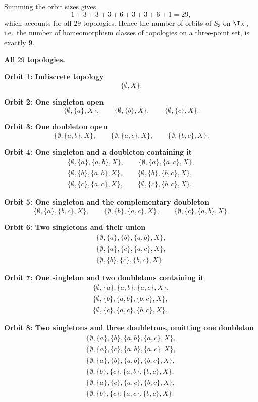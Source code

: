 Summing the orbit sizes gives
\[ 1+3+3+3+6+3+3+6+1=29, \]
which accounts for all $29$ topologies. Hence the number of orbits of $S_3$ on $\T_X$, i.e.\ the
number of homeomorphism classes of topologies on a three-point set, is exactly \textbf{9}.


\medskip\noindent\textbf{All $29$ topologies.}\par\medskip

\textbf{Orbit 1: Indiscrete topology}
\[ \{\emptyset,X\}. \]

\textbf{Orbit 2: One singleton open}
\[ \{\emptyset,\{a\},X\},\qquad\{\emptyset,\{b\},X\},\qquad\{\emptyset,\{c\},X\}. \]

\textbf{Orbit 3: One doubleton open}
\[ \{\emptyset,\{a,b\},X\},\qquad\{\emptyset,\{a,c\},X\},\qquad\{\emptyset,\{b,c\},X\}. \]

\textbf{Orbit 4: One singleton and a doubleton containing it}
\begin{gather*}
\{\emptyset,\{a\},\{a,b\},X\},\qquad\{\emptyset,\{a\},\{a,c\},X\},\\
\{\emptyset,\{b\},\{a,b\},X\},\qquad\{\emptyset,\{b\},\{b,c\},X\},\\
\{\emptyset,\{c\},\{a,c\},X\},\qquad\{\emptyset,\{c\},\{b,c\},X\}.
\end{gather*}

\textbf{Orbit 5: One singleton and the complementary doubleton}
\[ \{\emptyset,\{a\},\{b,c\},X\},\qquad\{\emptyset,\{b\},\{a,c\},X\},\qquad
   \{\emptyset,\{c\},\{a,b\},X\}. \]

\textbf{Orbit 6: Two singletons and their union}
\begin{gather*}
\{\emptyset,\{a\},\{b\},\{a,b\},X\},\\
\{\emptyset,\{a\},\{c\},\{a,c\},X\},\\
\{\emptyset,\{b\},\{c\},\{b,c\},X\}.
\end{gather*}

\textbf{Orbit 7: One singleton and two doubletons containing it}
\begin{gather*}
\{\emptyset,\{a\},\{a,b\},\{a,c\},X\},\\
\{\emptyset,\{b\},\{a,b\},\{b,c\},X\},\\
\{\emptyset,\{c\},\{a,c\},\{b,c\},X\}.
\end{gather*}

\textbf{Orbit 8: Two singletons and three doubletons, omitting one doubleton}
\begin{gather*}
\{\emptyset,\{a\},\{b\},\{a,b\},\{a,c\},X\},\\
\{\emptyset,\{a\},\{c\},\{a,b\},\{a,c\},X\},\\
\{\emptyset,\{a\},\{b\},\{a,b\},\{b,c\},X\},\\
\{\emptyset,\{b\},\{c\},\{a,b\},\{b,c\},X\},\\
\{\emptyset,\{a\},\{c\},\{a,c\},\{b,c\},X\},\\
\{\emptyset,\{b\},\{c\},\{a,c\},\{b,c\},X\}.
\end{gather*}

